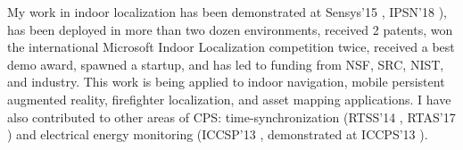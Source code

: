 \documentclass[10pt]{article}
\begin{document}
My work in indoor localization has been demonstrated at
Sensys'15 \cite{lazik2015alpsdemo}, IPSN'18 \cite{rajagopal2018welcome}), has been deployed in more than two dozen environments, received 2 patents, won the international
Microsoft Indoor Localization competition twice, received a best demo
award, spawned a startup, and has led to funding from NSF, SRC, NIST, and
industry. This work is being applied to indoor navigation, mobile
persistent augmented reality, firefighter localization, and asset
mapping applications.  I have also contributed to other areas of CPS:
time-synchronization (RTSS'14 \cite{buevich2013hardware}, RTAS'17 \cite{dongare2017pulsar}) and electrical energy
monitoring (ICCSP'13 \cite{rajagopal2013magnetic}, demonstrated at ICCPS'13 \cite{rajagopal2013demo}).






\end{document}
